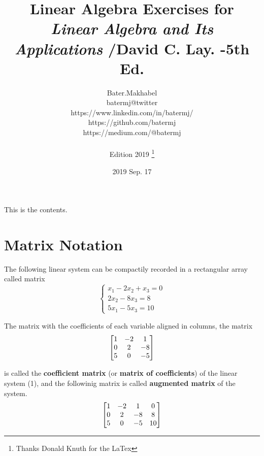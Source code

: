 \documentclass[12pt, letterpaper]{book}
\title{Linear Algebra Exercises for \emph{Linear Algebra and Its Applications} /David C. Lay. -5th Ed.}
\author{Bater.Makhabel \\batermj@twitter 
\\https://www.linkedin.com/in/batermj/ \\https://github.com/batermj \\https://medium.com/@batermj \\\\Edition 2019 \thanks{Thanks Donald Knuth for the LaTex}}
\date{2019 Sep. 17}
\begin{document}
\begin{titlepage}
\thispagestyle{empty} 
\end{titlepage}

\tableofcontents

\begin{comment}
This text won't show up in the compiled pdf
this is just a multi-line comment. Useful
to, for instance, comment out slow-rendering
while working on the draft.
\end{comment}

\newpage

This is the contents.

\setcounter{page}{1} 

\newpage
\section {Matrix Notation}

The following linear system can be compactily recorded in a rectangular array called matrix
\begin{equation}
\left\{
\begin{array}{l}
x_{1} - 2x_{2} + x_{3}  = 0\\
2x_{2} - 8x_{3} = 8\\
5x_{1} - 5x_{3} = 10
\end{array}
\right.
\end{equation}


The matrix with the coefficients of each variable aligned in columns, the matrix
\begin{equation}
\left.
\begin{array}{l}
$$\begin{bmatrix} 1 & -2 & 1 \\ 0 & 2 & -8 \\ 5 & 0 & -5 \end{bmatrix}$$
\end{array}
\right. 
\end{equation}


is called the \textbf{coefficient matrix} (or \textbf{matrix of coefficients}) of the linear system (1), and the followinig matrix is called \textbf{augmented matrix} of the system.
\begin{equation}
\left.
\begin{array}{l}
$$\begin{bmatrix} 1 & -2 & 1 & 0\\ 0 & 2 & -8 & 8\\ 5 & 0 & -5 &10
\end{bmatrix}$$
\end{array}
\right. 
\end{equation}
\end{document}
